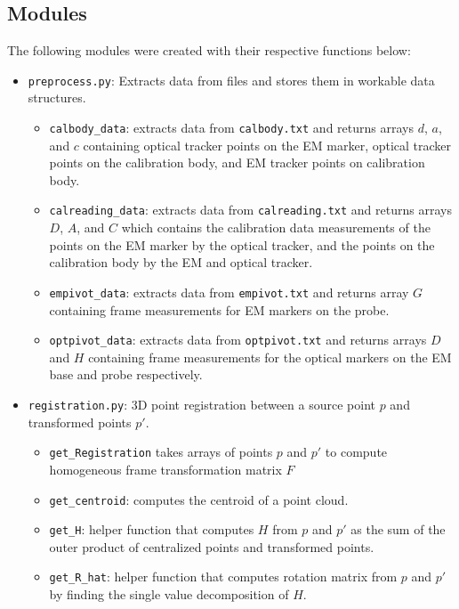 \documentclass[12pt,letterpaper]{scrartcl}
\begin{document}
    \subsection{Modules}
    The following modules were created with their respective functions below:
    \begin{itemize}
        \item \texttt{preprocess.py}: Extracts data from files and stores them in workable data structures.
        \begin{itemize}
            \item \texttt{calbody\_data}: extracts data from \texttt{calbody.txt} and returns arrays $d$, $a$, and $c$ containing optical tracker points on the EM marker, optical tracker points on the calibration body, and EM tracker points on calibration body.
            \item \texttt{calreading\_data}: extracts data from \texttt{calreading.txt} and returns arrays $D$, $A$, and $C$ which contains the calibration data measurements of the points on the EM marker by the optical tracker, and the points on the calibration body by the EM and optical tracker.
            \item \texttt{empivot\_data}: extracts data from \texttt{empivot.txt} and returns array $G$ containing frame measurements for EM markers on the probe.
            \item \texttt{optpivot\_data}: extracts data from \texttt{optpivot.txt} and returns arrays $D$ and $H$ containing frame measurements for the optical markers on the EM base and probe respectively.
        \end{itemize}
        \item \texttt{registration.py}: 3D point registration between a source point $p$ and transformed points $p'$.
        \begin{itemize}
            \item \texttt{get\_Registration} takes arrays of points $p$ and $p'$ to compute homogeneous frame transformation matrix $F$
            \item \texttt{get\_centroid}: computes the centroid of a point cloud.
            \item \texttt{get\_H}: helper function that computes $H$ from $p$ and $p'$ as the sum of the outer product of centralized points and transformed points.
            \item \texttt{get\_R\_hat}: helper function that computes rotation matrix from $p$ and $p'$ by finding the single value decomposition of $H$.

\end{itemize}
\end{itemize}
\end{document}

